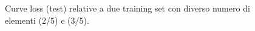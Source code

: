 \documentclass[a4paper,12pt]{article}
\begin{document}
\begin{figure}[htp]
    \centering

    \medskip


    \caption{Curve loss (test) relative a due training set con diverso numero di elementi (2/5) e (3/5).}
    \label{fig:c3-2}
\end{figure}
\end{document}
